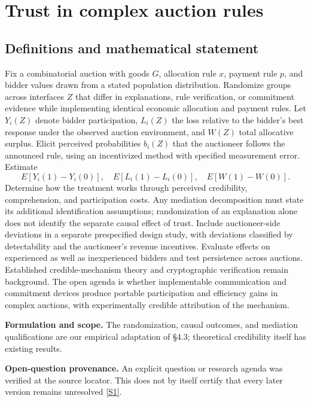 \documentclass[11pt]{article}
\newcommand{\sref}[2]{\hyperlink{source:#1:#2}{[S#2]}}
\begin{document}
\section*{Trust in complex auction rules}\label{30007577}
\subsection{Definitions and mathematical statement}
Fix a combinatorial auction with goods \(G\), allocation rule \(x\), payment rule \(p\), and bidder values drawn from a stated population distribution. Randomize groups across interfaces \(Z\) that differ in explanations, rule verification, or commitment evidence while implementing identical economic allocation and payment rules. Let \(Y_i(Z)\) denote bidder participation, \(L_i(Z)\) the loss relative to the bidder's best response under the observed auction environment, and \(W(Z)\) total allocative surplus. Elicit perceived probabilities \(b_i(Z)\) that the auctioneer follows the announced rule, using an incentivized method with specified measurement error. Estimate
\[
 E[Y_i(1)-Y_i(0)],\quad E[L_i(1)-L_i(0)],\quad E[W(1)-W(0)].
\]
Determine how the treatment works through perceived credibility, comprehension, and participation costs. Any mediation decomposition must state its additional identification assumptions; randomization of an explanation alone does not identify the separate causal effect of trust. Include auctioneer-side deviations in a separate prespecified design study, with deviations classified by detectability and the auctioneer's revenue incentives. Evaluate effects on experienced as well as inexperienced bidders and test persistence across auctions. Established credible-mechanism theory and cryptographic verification remain background. The open agenda is whether implementable communication and commitment devices produce portable participation and efficiency gains in complex auctions, with experimentally credible attribution of the mechanism.

\par\textbf{Formulation and scope.} The randomization, causal outcomes, and mediation qualifications are our empirical adaptation of §4.3; theoretical credibility itself has existing results.

\par\textbf{Open-question provenance.} An explicit question or research agenda was verified at the source locator. This does not by itself certify that every later version remains unresolved \sref{30007577}{1}.
\end{document}
